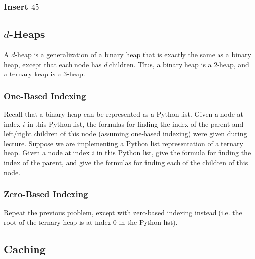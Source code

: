 \documentclass{article}
\begin{document}
\subsubsection{Insert $45$}

\begin{mdframed}
\vspace{3em}
\end{mdframed}

\subsection{$d$-Heaps}

A $d$-heap is a generalization of a binary heap that is exactly the same as a binary heap, except that each node has $d$ children. Thus, a binary heap is a $2$-heap, and a ternary heap is a $3$-heap.

\subsubsection{One-Based Indexing}

Recall that a binary heap can be represented as a Python list. Given a node at index $i$ in this Python list, the formulas for finding the index of the parent and left/right children of this node (assuming one-based indexing) were given during lecture. Suppose we are implementing a Python list representation of a ternary heap. Given a node at index $i$ in this Python list, give the formula for finding the index of the parent, and give the formulas for finding each of the children of this node.

\begin{mdframed}
\vspace{3em}
\end{mdframed}

\subsubsection{Zero-Based Indexing}

Repeat the previous problem, except with zero-based indexing instead (i.e. the root of the ternary heap is at index 0 in the Python list).

\begin{mdframed}
\vspace{3em}
\end{mdframed}

\subsection{Caching}
\end{document}
